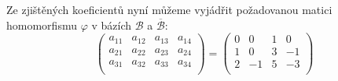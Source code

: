 \begin{example}
    Ze zjištěných koeficientů nyní můžeme vyjádřit požadovanou matici homomorfismu $\varphi$ v
    bázích $\mathcal{B}$ a $\overline{\mathcal{B}}$:
    \[
        \begin{pmatrix}
            a_{11} & a_{12} & a_{13} & a_{14} \\
            a_{21} & a_{22} & a_{23} & a_{24} \\
            a_{31} & a_{32} & a_{33} & a_{34} \\
        \end{pmatrix} =
        \begin{pmatrix}
            0 & 0 & 1 & 0\\
            1 & 0 & 3 & -1\\
            2 & -1 & 5 & -3\\
        \end{pmatrix}
    \]
\end{example}

